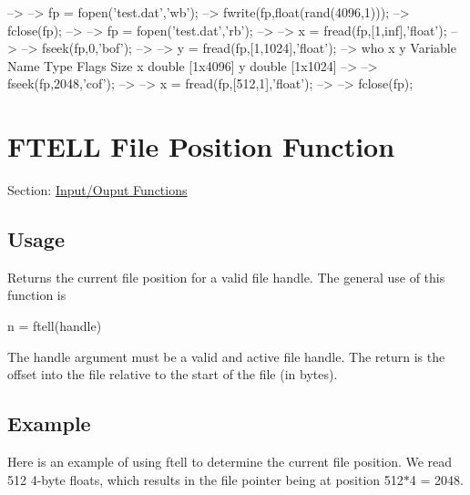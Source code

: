 \begin{DoxyVerbInclude}
--> %
--> fp = fopen('test.dat','wb');
--> fwrite(fp,float(rand(4096,1)));
--> fclose(fp);
--> %
--> fp = fopen('test.dat','rb');
--> %
--> x = fread(fp,[1,inf],'float');
--> %
--> fseek(fp,0,'bof');
--> %
--> y = fread(fp,[1,1024],'float');
--> who x y
  Variable Name       Type   Flags             Size
              x    double                    [1x4096]
              y    double                    [1x1024]
--> %
--> fseek(fp,2048,'cof');
--> %
--> x = fread(fp,[512,1],'float');
--> %
--> fclose(fp);
\end{DoxyVerbInclude}
 \hypertarget{io_ftell}{}\section{F\-T\-E\-L\-L File Position Function}\label{io_ftell}
Section\-: \hyperlink{sec_io}{Input/\-Ouput Functions} \hypertarget{vtkwidgets_vtkxyplotwidget_Usage}{}\subsection{Usage}\label{vtkwidgets_vtkxyplotwidget_Usage}
Returns the current file position for a valid file handle. The general use of this function is \begin{DoxyVerb}  n = ftell(handle)
\end{DoxyVerb}
 The {\ttfamily handle} argument must be a valid and active file handle. The return is the offset into the file relative to the start of the file (in bytes). \hypertarget{variables_struct_Example}{}\subsection{Example}\label{variables_struct_Example}
Here is an example of using {\ttfamily ftell} to determine the current file position. We read 512 4-\/byte floats, which results in the file pointer being at position 512$\ast$4 = 2048.



